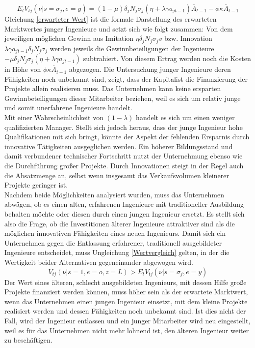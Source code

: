 %
	\begin{equation}
		E_tV_{tj} (\nu|s=\sigma_j,e=y)=(1-\mu)\delta_j N_j\sigma_j(\eta +\lambda\gamma a_{j t-1})\overline{A}_{t-1}-\phi\kappa\overline{A}_{t-1}\label{erwarteter Wert}
	\end{equation}
%
Gleichung \eqref{erwarteter Wert} ist die formale Darstellung des erwarteten Marktwertes junger Ingenieure und setzt sich wie folgt zusammen: 
Von dem jeweiligen möglichen Gewinn aus Imitation $\eta\delta_j N_j\sigma_jv$ bzw. Innovation $\lambda\gamma a_{j t-1}\delta_j N_j\sigma_j$ werden jeweils die Gewinnbeteiligungen der Ingenieure $-\mu\delta_j N_j\sigma_j(\eta +\lambda\gamma a_{j t-1})$ subtrahiert. Von diesem Ertrag werden noch die Kosten in Höhe von $\phi\kappa\overline{A}_{t-1}$ abgezogen. 
%
Die Untersuchung junger Ingenieure deren Fähigkeiten noch unbekannt sind, zeigt, dass der Kapitalist die Finanzierung der Projekte allein realisieren muss. Das Unternehmen kann keine ersparten Gewinnbeteiligungen dieser Mitarbeiter beziehen, weil es sich um relativ junge und somit unerfahrene Ingenieure handelt. \\
%
Mit einer Wahrscheinlichkeit von $(1-\lambda)$ handelt es sich um einen weniger qualifizierten Manager. Stellt sich jedoch heraus, dass der junge Ingenieur hohe Qualifikationen mit sich bringt, könnte der Aspekt der fehlenden Ersparnis durch innovative Tätigkeiten ausgeglichen werden. Ein höherer Bildungsstand und damit verbundener technischer Fortschritt nutzt der Unternehmung ebenso wie die Durchführung großer Projekte. Durch Innovationen steigt in der Regel auch die Absatzmenge an, selbst wenn insgesamt das Verkaufsvolumen kleinerer Projekte geringer ist. \\
%
Nachdem beide Möglichkeiten analysiert wurden, muss das Unternehmen abwägen, ob es einen alten, erfahrenen Ingenieure mit traditioneller Ausbildung behalten möchte oder diesen durch einen jungen Ingenieur ersetzt. Es stellt sich also die Frage, ob die Investitionen älterer Ingenieure attraktiver sind als die möglichen innovativen Fähigkeiten eines neuen Ingenieurs. Damit sich ein Unternehmen gegen die Entlassung erfahrener, traditionell ausgebildeter Ingenieure entscheidet, muss  Ungleichung \eqref{Wertvergleich} gelten, in der die Wertigkeit beider Alternativen gegeneinander abgewogen wird.
%
	\begin{equation}
		V_{tj}(\nu|s=1,e=o,z=L) > E_t V_{tj} (\nu|s=\sigma_j,e=y)\label{Wertvergleich}
	\end{equation}
%
Der Wert eines älteren, schlecht ausgebildeten Ingenieurs, mit dessen Hilfe große Projekte finanziert werden können, muss höher sein als der erwartete Marktwert, wenn das Unternehmen einen jungen Ingenieur einsetzt, mit dem kleine Projekte realisiert werden und dessen Fähigkeiten noch unbekannt sind. Ist dies nicht der Fall, wird der Ingenieur entlassen und ein junger Mitarbeiter wird neu eingestellt, weil es für das Unternehmen nicht mehr lohnend ist, den älteren Ingenieur weiter zu beschäftigen. \\
